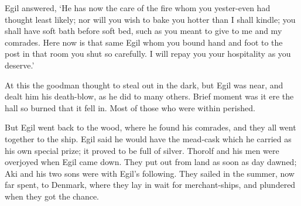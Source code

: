 Egil answered, `He has now the care of the fire whom you yester-even had thought least likely; nor will you wish to bake you hotter than I shall kindle; you shall have soft bath before soft bed, such as you meant to give to me and my comrades. Here now is that same Egil whom you bound hand and foot to the post in that room you shut so carefully. I will repay you your hospitality as you deserve.'

At this the goodman thought to steal out in the dark, but Egil was near, and dealt him his death-blow, as he did to many others. Brief moment was it ere the hall so burned that it fell in. Most of those who were within perished.

But Egil went back to the wood, where he found his comrades, and they all went together to the ship. Egil said he would have the mead-cask which he carried as his own special prize; it proved to be full of silver. Thorolf and his men were overjoyed when Egil came down. They put out from land as soon as day dawned; Aki and his two sons were with Egil's following. They sailed in the summer, now far spent, to Denmark, where they lay in wait for merchant-ships, and plundered when they got the chance.
